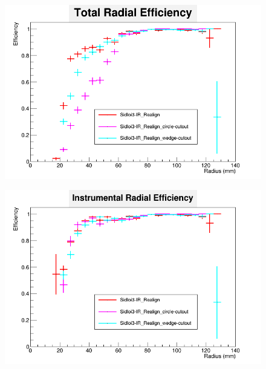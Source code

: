 \documentclass{report}
\begin{document}
                \begin{figure}[H] 
                    \includegraphics[width=\textwidth]{RadialEfficiency_total_geom}
                    \centering
                    \caption{}
                    \label{fig__geom_beamcal_total}
                \end{figure}
                \begin{figure}[H]
                    \includegraphics[width=\textwidth]{RadialEfficiency_instrumental_geom}
                    \centering
                    \caption{}
                    \label{fig__geom_beamcal_inst}
                \end{figure}
\end{document}
